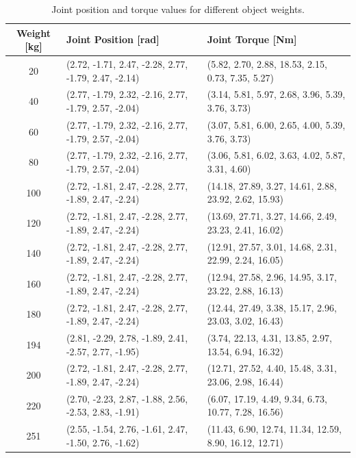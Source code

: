 \documentclass[a4paper,11pt]{article}
\renewcommand{\arraystretch}{1.4}
\begin{document}
\begin{table}[htbp]
\centering
\small
\renewcommand{\arraystretch}{1.1}
\setlength{\tabcolsep}{3pt}
\caption{Joint position and torque values for different object weights.}
\begin{tabular}{|c|p{7cm}|p{7cm}|}
\hline
\label{tab:exp_grasp_weight}
\textbf{Weight [kg]} & \textbf{Joint Position [rad]} & \textbf{Joint Torque [Nm]} \\
\hline
20 & (2.72, -1.71, 2.47, -2.28, 2.77, -1.79, 2.47, -2.14) & (5.82, 2.70, 2.88, 18.53, 2.15, 0.73, 7.35, 5.27) \\
\hline
40 & (2.77, -1.79, 2.32, -2.16, 2.77, -1.79, 2.57, -2.04) & (3.14, 5.81, 5.97, 2.68, 3.96, 5.39, 3.76, 3.73) \\
\hline
60 & (2.77, -1.79, 2.32, -2.16, 2.77, -1.79, 2.57, -2.04) & (3.07, 5.81, 6.00, 2.65, 4.00, 5.39, 3.76, 3.73) \\
\hline
80 & (2.77, -1.79, 2.32, -2.16, 2.77, -1.79, 2.57, -2.04) & (3.06, 5.81, 6.02, 3.63, 4.02, 5.87, 3.31, 4.60) \\
\hline
100 & (2.72, -1.81, 2.47, -2.28, 2.77, -1.89, 2.47, -2.24) & (14.18, 27.89, 3.27, 14.61, 2.88, 23.92, 2.62, 15.93) \\
\hline
120 & (2.72, -1.81, 2.47, -2.28, 2.77, -1.89, 2.47, -2.24) & (13.69, 27.71, 3.27, 14.66, 2.49, 23.23, 2.41, 16.02) \\
\hline
140 & (2.72, -1.81, 2.47, -2.28, 2.77, -1.89, 2.47, -2.24) & (12.91, 27.57, 3.01, 14.68, 2.31, 22.99, 2.24, 16.05) \\
\hline
160 & (2.72, -1.81, 2.47, -2.28, 2.77, -1.89, 2.47, -2.24) & (12.94, 27.58, 2.96, 14.95, 3.17, 23.22, 2.88, 16.13) \\
\hline
180 & (2.72, -1.81, 2.47, -2.28, 2.77, -1.89, 2.47, -2.24) & (12.44, 27.49, 3.38, 15.17, 2.96, 23.03, 3.02, 16.43) \\
\hline
194 & (2.81, -2.29, 2.78, -1.89, 2.41, -2.57, 2.77, -1.95) & (3.74, 22.13, 4.31, 13.85, 2.97, 13.54, 6.94, 16.32) \\
\hline
200 & (2.72, -1.81, 2.47, -2.28, 2.77, -1.89, 2.47, -2.24) & (12.71, 27.52, 4.40, 15.48, 3.31, 23.06, 2.98, 16.44) \\
\hline
220 & (2.70, -2.23, 2.87, -1.88, 2.56, -2.53, 2.83, -1.91) & (6.07, 17.19, 4.49, 9.34, 6.73, 10.77, 7.28, 16.56) \\
\hline
251 & (2.55, -1.54, 2.76, -1.61, 2.47, -1.50, 2.76, -1.62) & (11.43, 6.90, 12.74, 11.34, 12.59, 8.90, 16.12, 12.71) \\
\hline
\end{tabular}
\end{table}
\end{document}
